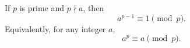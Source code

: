 If $p$ is prime and $p \nmid a$, then
$$a^{p-1} \equiv 1 \pmod{p}.$$
Equivalently, for any integer $a$,
$$a^p \equiv a \pmod{p}.$$

